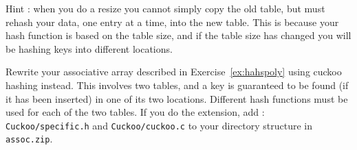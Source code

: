 Hint : when you do a resize you cannot simply
copy the old table, but must rehash your data, one entry at a time,
into the new table.  This is because your hash function is based on the
table size, and if the table size has changed you will be hashing keys
into different locations.


\begin{exercise}
Rewrite your associative array described in Exercise~\ref{ex:hahspoly}
using cuckoo hashing instead.
This involves two tables, and a key is guaranteed to be found (if it
has been inserted) in one of its two locations. Different hash functions
must be used for each of the two tables.
If you do the extension, add :\\
\verb^Cuckoo/specific.h^ and \verb^Cuckoo/cuckoo.c^
to your directory structure in \verb^assoc.zip^.
\end{exercise}

